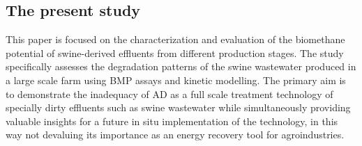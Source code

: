 \subsection{The present study}
This paper is focused on the characterization and evaluation of the biomethane potential of swine-derived effluents from different production stages. The study specifically assesses the degradation patterns of the swine wastewater produced in a large scale farm using BMP assays and kinetic modelling. The primary aim is to demonstrate the inadequacy of AD as a full scale treatment technology of specially dirty effluents such as swine wastewater while simultaneously providing valuable insights for a future in situ implementation of the technology, in this way not devaluing its importance as an energy recovery tool for agroindustries.